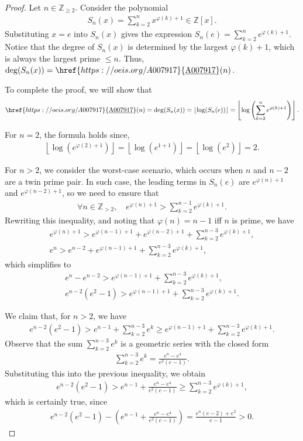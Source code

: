 \documentclass[10pt,a4paper]{article}
\theoremstyle{plain}
\newcommand{\floor}[1]{\left\lfloor #1 \right\rfloor}
\newcommand{\Z}{\mathbb{Z}}
\newcommand{\seqnum}[1]{\href{https://oeis.org/#1}{\rm \underline{#1}}}
\begin{document}
\begin{proof}
Let $n \in \Z_{\geq 2}$. Consider the polynomial
\begin{align*}
S_n(x) = \sum_{k=2}^n x^{\varphi(k)+1} \in \Z[x].
\end{align*}
Substituting $x = e$ into $S_n(x)$ gives the expression $S_n(e) = \sum_{k=2}^n e^{\varphi(k)+1}$. Notice that the degree of $S_n(x)$ is determined by the largest $\varphi(k) + 1$, which is always the largest prime $\leq n$. Thus, $\deg(S_n(x)) = \seqnum{A007917}(n)$.

To complete the proof, we will show that 
\begin{align*}
\seqnum{A007917}(n) = \deg(S_n(x)) = \floor{\log(S_n(e))} = \floor{ \log\left( \sum_{k=2}^n e^{\varphi(k)+1} \right) } .
\end{align*}

For $n=2$, the formula holds since,
\begin{align*}
    \floor{\log(e^{\varphi(2)+1})} = \floor{\log(e^{1+1})} = \floor{\log(e^2)} = 2 .
\end{align*}

For $n > 2$, we consider the worst-case scenario, which occurs when $n$ and $n-2$ are a twin prime pair. In such case, the leading terms in $S_n(e)$ are $e^{\varphi(n)+1}$ and $e^{\varphi(n-2)+1}$, so we need to ensure that
\begin{align*}
\forall n \in \Z_{>2}, \quad
e^{\varphi(n)+1} > \sum_{k=2}^{n-1} e^{\varphi(k)+1} .
\end{align*}
Rewriting this inequality, and noting that $\varphi(n) = n-1$ iff $n$ is prime, we have
\begin{align*}
e^{\varphi(n)+1} > e^{\varphi(n-1)+1} + e^{\varphi(n-2)+1} + \sum_{k=2}^{n-3} e^{\varphi(k)+1} , \\
e^n > e^{n-2} + e^{\varphi(n-1)+1} + \sum_{k=2}^{n-3} e^{\varphi(k)+1} ,
\end{align*}
which simplifies to
\begin{align*}
e^n - e^{n-2} > e^{\varphi(n-1)+1} + \sum_{k=2}^{n-3} e^{\varphi(k)+1} , \\
e^{n-2} (e^2-1) > e^{\varphi(n-1)+1} + \sum_{k=2}^{n-3} e^{\varphi(k)+1}.
\end{align*}

We claim that, for $n > 2$, we have
\begin{align*}
e^{n-2} (e^2-1) > e^{n-1} + \sum_{k=2}^{n-3} e^k \geq e^{\varphi(n-1)+1} + \sum_{k=2}^{n-3} e^{\varphi(k)+1}.
\end{align*}
Observe that the sum $\sum_{k=2}^{n-3} e^k$ is a geometric series with the closed form
\begin{align*}
\sum_{k=2}^{n-3} e^k = \frac{e^n-e^4}{e^2(e-1)} .
\end{align*}
Substituting this into the previous inequality, we obtain
\begin{align*}
e^{n-2} (e^2-1) > e^{n-1} + \frac{e^n-e^4}{e^2(e-1)} \geq \sum_{k=2}^{n-3} e^{\varphi(k)+1} ,
\end{align*}
which is certainly true, since
\begin{align*}
    e^{n-2} (e^2-1) - \left(e^{n-1} + \frac{e^n-e^4}{e^2(e-1)}\right) = \frac{e^n (e-2) + e^2}{e-1} > 0 .
\end{align*}


\end{proof}
\end{document}

